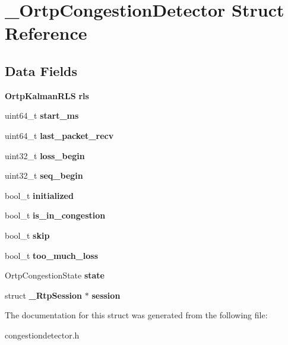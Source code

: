 \section{\+\_\+\+Ortp\+Congestion\+Detector Struct Reference}
\label{struct__OrtpCongestionDetector}
\subsection*{Data Fields}
\begin{DoxyCompactItemize}
\item 
\mbox{\label{struct__OrtpCongestionDetector_ad2ae9d07a6a797f08022ac7a65704f56}} 
\textbf{ Ortp\+Kalman\+R\+LS} {\bfseries rls}
\item 
\mbox{\label{struct__OrtpCongestionDetector_a910ce2b06ca7354b871c88464acadeba}} 
uint64\+\_\+t {\bfseries start\+\_\+ms}
\item 
\mbox{\label{struct__OrtpCongestionDetector_a1b5143b1ee29c3ee0088b4491b627a0f}} 
uint64\+\_\+t {\bfseries last\+\_\+packet\+\_\+recv}
\item 
\mbox{\label{struct__OrtpCongestionDetector_ac579138368749c17e91fe98b01f34107}} 
uint32\+\_\+t {\bfseries loss\+\_\+begin}
\item 
\mbox{\label{struct__OrtpCongestionDetector_ad8a15b630e7e6b5b0fc437dbf16c61ea}} 
uint32\+\_\+t {\bfseries seq\+\_\+begin}
\item 
\mbox{\label{struct__OrtpCongestionDetector_a4707c344c16832a77854092bee0cc946}} 
bool\+\_\+t {\bfseries initialized}
\item 
\mbox{\label{struct__OrtpCongestionDetector_a1b0a1f38e293d40ad169bfb38dc76592}} 
bool\+\_\+t {\bfseries is\+\_\+in\+\_\+congestion}
\item 
\mbox{\label{struct__OrtpCongestionDetector_a21ed04a9aadd05b2598bfc9b09464e28}} 
bool\+\_\+t {\bfseries skip}
\item 
\mbox{\label{struct__OrtpCongestionDetector_a966f1874a2ac0cb576e443c0c2114b3c}} 
bool\+\_\+t {\bfseries too\+\_\+much\+\_\+loss}
\item 
\mbox{\label{struct__OrtpCongestionDetector_a5eb1c3063d03054b278a8f14ed528da1}} 
Ortp\+Congestion\+State {\bfseries state}
\item 
\mbox{\label{struct__OrtpCongestionDetector_a1b723b9668479d71fcda5ef2ed353cc5}} 
struct \textbf{ \+\_\+\+Rtp\+Session} $\ast$ {\bfseries session}
\end{DoxyCompactItemize}


The documentation for this struct was generated from the following file\+:\begin{DoxyCompactItemize}
\item 
congestiondetector.\+h\end{DoxyCompactItemize}
